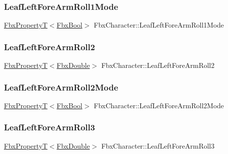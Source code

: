 \subsubsection{\texorpdfstring{Leaf\+Left\+Fore\+Arm\+Roll1\+Mode}{LeafLeftForeArmRoll1Mode}}
{\footnotesize\ttfamily \hyperlink{class_fbx_property_t}{Fbx\+PropertyT}$<$\hyperlink{fbxtypes_8h_a92e0562b2fe33e76a242f498b362262e}{Fbx\+Bool}$>$ Fbx\+Character\+::\+Leaf\+Left\+Fore\+Arm\+Roll1\+Mode}

\mbox{\label{class_fbx_character_aca4aad2d5dc46cb61dd8ad54aeef10ff}} 
\subsubsection{\texorpdfstring{Leaf\+Left\+Fore\+Arm\+Roll2}{LeafLeftForeArmRoll2}}
{\footnotesize\ttfamily \hyperlink{class_fbx_property_t}{Fbx\+PropertyT}$<$\hyperlink{fbxtypes_8h_a171e72a1c46fc15c1a6c9c31948c1c5b}{Fbx\+Double}$>$ Fbx\+Character\+::\+Leaf\+Left\+Fore\+Arm\+Roll2}

\mbox{\label{class_fbx_character_aef6a91eaa820543ae718cf34569a99be}} 
\subsubsection{\texorpdfstring{Leaf\+Left\+Fore\+Arm\+Roll2\+Mode}{LeafLeftForeArmRoll2Mode}}
{\footnotesize\ttfamily \hyperlink{class_fbx_property_t}{Fbx\+PropertyT}$<$\hyperlink{fbxtypes_8h_a92e0562b2fe33e76a242f498b362262e}{Fbx\+Bool}$>$ Fbx\+Character\+::\+Leaf\+Left\+Fore\+Arm\+Roll2\+Mode}

\mbox{\label{class_fbx_character_a8e1ddd422cfd58cce77f5f165faf6471}} 
\subsubsection{\texorpdfstring{Leaf\+Left\+Fore\+Arm\+Roll3}{LeafLeftForeArmRoll3}}
{\footnotesize\ttfamily \hyperlink{class_fbx_property_t}{Fbx\+PropertyT}$<$\hyperlink{fbxtypes_8h_a171e72a1c46fc15c1a6c9c31948c1c5b}{Fbx\+Double}$>$ Fbx\+Character\+::\+Leaf\+Left\+Fore\+Arm\+Roll3}

